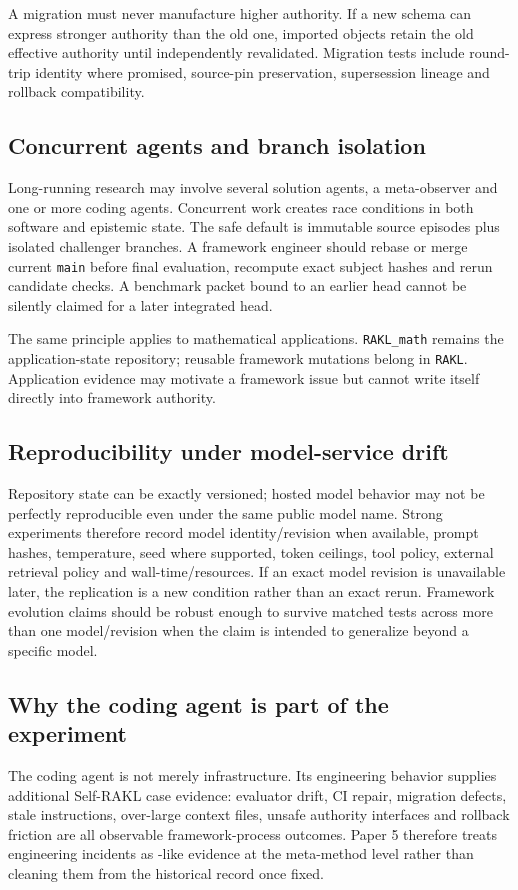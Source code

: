A migration must never manufacture higher authority. If a new schema can express stronger authority than the old one, imported objects retain the old effective authority until independently revalidated. Migration tests include round-trip identity where promised, source-pin preservation, supersession lineage and rollback compatibility.

\subsection{Concurrent agents and branch isolation}

Long-running research may involve several solution agents, a meta-observer and one or more coding agents. Concurrent work creates race conditions in both software and epistemic state. The safe default is immutable source episodes plus isolated challenger branches. A framework engineer should rebase or merge current \texttt{main} before final evaluation, recompute exact subject hashes and rerun candidate checks. A benchmark packet bound to an earlier head cannot be silently claimed for a later integrated head.

The same principle applies to mathematical applications. \texttt{RAKL\_math} remains the application-state repository; reusable framework mutations belong in \texttt{RAKL}. Application evidence may motivate a framework issue but cannot write itself directly into framework authority.

\subsection{Reproducibility under model-service drift}

Repository state can be exactly versioned; hosted model behavior may not be perfectly reproducible even under the same public model name. Strong experiments therefore record model identity/revision when available, prompt hashes, temperature, seed where supported, token ceilings, tool policy, external retrieval policy and wall-time/resources. If an exact model revision is unavailable later, the replication is a new condition rather than an exact rerun. Framework evolution claims should be robust enough to survive matched tests across more than one model/revision when the claim is intended to generalize beyond a specific model.

\subsection{Why the coding agent is part of the experiment}

The coding agent is not merely infrastructure. Its engineering behavior supplies additional Self-RAKL case evidence: evaluator drift, CI repair, migration defects, stale instructions, over-large context files, unsafe authority interfaces and rollback friction are all observable framework-process outcomes. Paper 5 therefore treats engineering incidents as \TaskEpisode{}-like evidence at the meta-method level rather than cleaning them from the historical record once fixed.